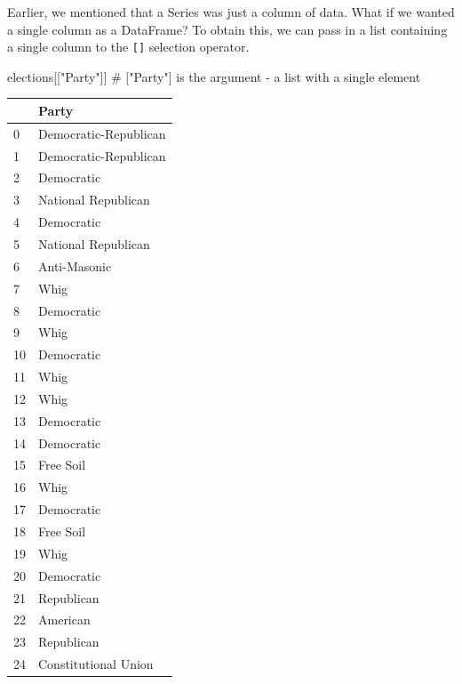 \documentclass[
  letterpaper,
  DIV=11,
  numbers=noendperiod]{scrreprt}
\newenvironment{Shaded}{\begin{snugshade}}{\end{snugshade}}
\newcommand{\CommentTok}[1]{\textcolor[rgb]{0.37,0.37,0.37}{#1}}
\newcommand{\NormalTok}[1]{\textcolor[rgb]{0.00,0.23,0.31}{#1}}
\newcommand{\StringTok}[1]{\textcolor[rgb]{0.13,0.47,0.30}{#1}}
\begin{document}
Earlier, we mentioned that a Series was just a column of data. What if
we wanted a single column as a DataFrame? To obtain this, we can pass in
a list containing a single column to the \texttt{{[}{]}} selection
operator.

\begin{Shaded}
\begin{Highlighting}[]
\NormalTok{elections[[}\StringTok{"Party"}\NormalTok{]] }\CommentTok{\# ["Party"] is the argument {-} a list with a single element}
\end{Highlighting}
\end{Shaded}

\begin{tabular}{ll}
\toprule
{} &                  Party \\
\midrule
0   &  Democratic-Republican \\
1   &  Democratic-Republican \\
2   &             Democratic \\
3   &    National Republican \\
4   &             Democratic \\
5   &    National Republican \\
6   &           Anti-Masonic \\
7   &                   Whig \\
8   &             Democratic \\
9   &                   Whig \\
10  &             Democratic \\
11  &                   Whig \\
12  &                   Whig \\
13  &             Democratic \\
14  &             Democratic \\
15  &              Free Soil \\
16  &                   Whig \\
17  &             Democratic \\
18  &              Free Soil \\
19  &                   Whig \\
20  &             Democratic \\
21  &             Republican \\
22  &               American \\
23  &             Republican \\
24  &   Constitutional Union \\

\end{tabular}
\end{document}
